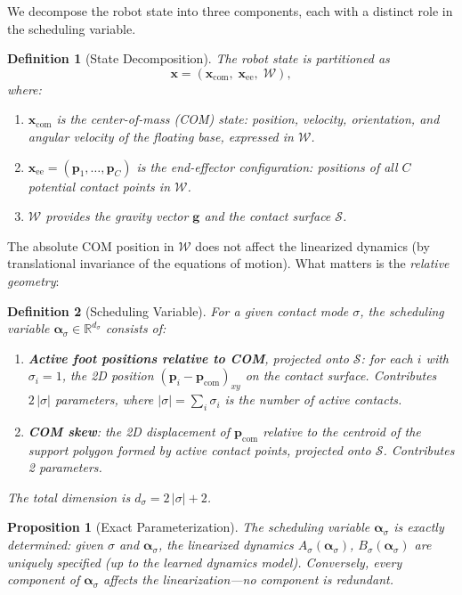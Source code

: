 \documentclass[letterpaper, 10pt, conference]{IEEEtran}
\newtheorem{definition}{Definition}
\newtheorem{proposition}{Proposition}
\newcommand{\R}{\mathbb{R}}
\newcommand{\balpha}{\bm{\alpha}}
\newcommand{\bx}{\bm{x}}
\newcommand{\bp}{\bm{p}}
\newcommand{\cW}{\mathcal{W}}
\newcommand{\cS}{\mathcal{S}}
\begin{document}
We decompose the robot state into three components,
each with a distinct role in the scheduling variable.

\begin{definition}[State Decomposition]\label{def:decomp}
The robot state is partitioned as
\begin{equation}\label{eq:decomp}
  \bx = (\bx_{\mathrm{com}},\; \bx_{\mathrm{ee}},\; \cW),
\end{equation}
where:
\begin{enumerate}
  \item $\bx_{\mathrm{com}}$ is the \emph{center-of-mass (COM) state}:
    position, velocity, orientation, and angular velocity of the
    floating base, expressed in $\cW$.
  \item $\bx_{\mathrm{ee}} = (\bp_1, \ldots, \bp_C)$ is the
    \emph{end-effector configuration}: positions of all $C$
    potential contact points in $\cW$.
  \item $\cW$ provides the gravity vector $\bm{g}$ and the
    contact surface $\cS$.
\end{enumerate}
\end{definition}

The absolute COM position in $\cW$ does not affect the
linearized dynamics (by translational invariance of the
equations of motion).
What matters is the \emph{relative geometry}:

\begin{definition}[Scheduling Variable]\label{def:alpha}
For a given contact mode $\sigma$, the \emph{scheduling variable}
$\balpha_\sigma \in \R^{d_\sigma}$ consists of:
\begin{enumerate}
  \item \textbf{Active foot positions relative to COM},
    projected onto $\cS$:
    for each $i$ with $\sigma_i = 1$,
    the 2D position $(\bp_i - \bp_{\mathrm{com}})_{xy}$
    on the contact surface.
    Contributes $2 \, |\sigma|$ parameters,
    where $|\sigma| = \sum_i \sigma_i$ is the number of
    active contacts.
  \item \textbf{COM skew}: the 2D displacement of
    $\bp_{\mathrm{com}}$ relative to the centroid
    of the support polygon formed by active contact points,
    projected onto $\cS$.
    Contributes 2 parameters.
\end{enumerate}
The total dimension is $d_\sigma = 2\,|\sigma| + 2$.
\end{definition}

\begin{proposition}[Exact Parameterization]\label{prop:exact}
The scheduling variable $\balpha_\sigma$ is \emph{exactly
determined}: given $\sigma$ and $\balpha_\sigma$,
the linearized dynamics $A_\sigma(\balpha_\sigma)$,
$B_\sigma(\balpha_\sigma)$ are uniquely specified
(up to the learned dynamics model).
Conversely, every component of $\balpha_\sigma$
affects the linearization---no component is redundant.
\end{proposition}
\end{document}
